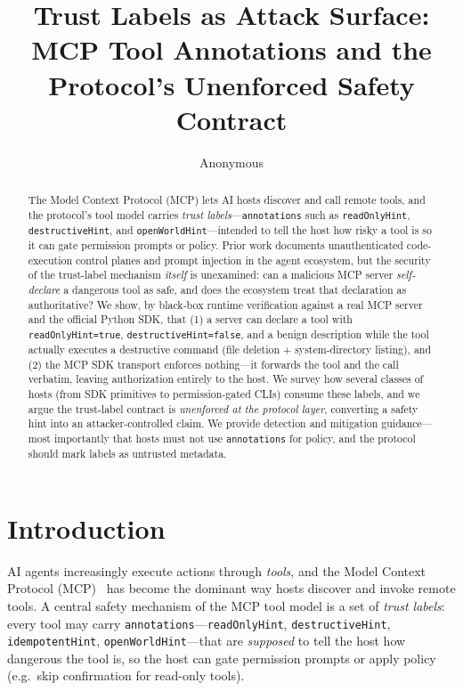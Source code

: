 \documentclass{llncs}
\begin{document}
\title{Trust Labels as Attack Surface: MCP Tool Annotations and the Protocol's Unenforced Safety Contract}

\author{Anonymous}

\maketitle

\begin{abstract}
The Model Context Protocol (MCP) lets AI hosts discover and call remote tools, and the protocol's tool model carries \emph{trust labels}---\texttt{annotations} such as \texttt{readOnlyHint}, \texttt{destructiveHint}, and \texttt{openWorldHint}---intended to tell the host how risky a tool is so it can gate permission prompts or policy. Prior work documents unauthenticated code-execution control planes and prompt injection in the agent ecosystem, but the security of the trust-label mechanism \emph{itself} is unexamined: can a malicious MCP server \emph{self-declare} a dangerous tool as safe, and does the ecosystem treat that declaration as authoritative? We show, by black-box runtime verification against a real MCP server and the official Python SDK, that (1) a server can declare a tool with \texttt{readOnlyHint=true}, \texttt{destructiveHint=false}, and a benign description while the tool actually executes a destructive command (file deletion + system-directory listing), and (2) the MCP SDK transport enforces nothing---it forwards the tool and the call verbatim, leaving authorization entirely to the host. We survey how several classes of hosts (from SDK primitives to permission-gated CLIs) consume these labels, and we argue the trust-label contract is \emph{unenforced at the protocol layer}, converting a safety hint into an attacker-controlled claim. We provide detection and mitigation guidance---most importantly that hosts must not use \texttt{annotations} for policy, and the protocol should mark labels as untrusted metadata.
\end{abstract}


\section{Introduction}\label{sec:intro}

AI agents increasingly execute actions through \emph{tools}, and the Model Context Protocol (MCP)~\cite{mcp-spec} has become the dominant way hosts discover and invoke remote tools. A central safety mechanism of the MCP tool model is a set of \emph{trust labels}: every tool may carry \texttt{annotations}---\texttt{readOnlyHint}, \texttt{destructiveHint}, \texttt{idempotentHint}, \texttt{openWorldHint}---that are \emph{supposed} to tell the host how dangerous the tool is, so the host can gate permission prompts or apply policy (e.g.\ skip confirmation for read-only tools).
\end{document}
